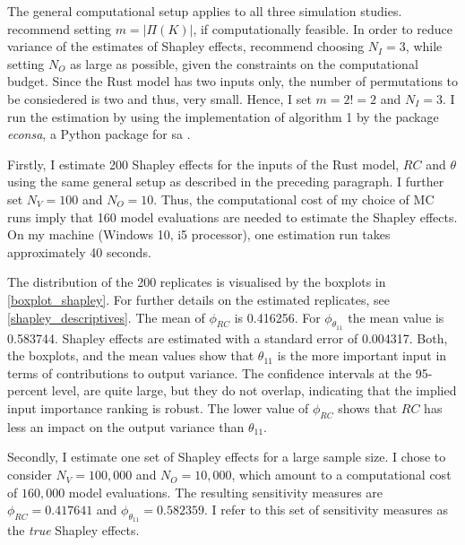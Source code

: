The general computational setup applies to all three simulation studies. \citet{SNS16} recommend setting $m=\vert \Pi(K) \vert$, if computationally feasible. In order to reduce variance of the estimates of Shapley effects, \citet{SNS16} recommend choosing $N_I=3$, while setting $N_O$ as large as possible, given the constraints on the computational budget. Since the Rust model has two inputs only, the number of permutations to be consiedered is two and thus, very small. Hence, I set $m=2!=2$ and $N_I=3$. I run the estimation by using the implementation of algorithm 1 by the package \textit{econsa}, a Python package for sa \citep{OSE21}.


Firstly, I estimate 200 Shapley effects for the inputs of the Rust model, $RC$ and $\theta$ using the same general setup as described in the preceding paragraph. I further set $N_V=100$ and $N_O=10$. Thus, the computational cost of my choice of MC runs imply that 160 model evaluations are needed to estimate the Shapley effects. On my machine (Windows 10, i5 processor), one estimation run takes approximately 40 seconds.

The distribution of the 200 replicates is visualised by the boxplots in \cref{boxplot_shapley}. For further details on the estimated replicates, see \cref{shapley_descriptives}. The mean of $\phi_{RC}$ is 0.416256. For $\phi_{\theta_{11}}$ the mean value is 0.583744. Shapley effects are estimated with a standard error of 0.004317.
Both, the boxplots, and the mean values show that $\theta_{11}$ is the more important input in terms of contributions to output variance. The confidence intervals at the 95-percent level, are quite large, but they do not overlap, indicating that the implied input importance ranking is robust. The lower value of $\phi_{RC}$ shows that $RC$ has less an impact on the output variance than $\theta_{11}$.


Secondly, I estimate one set of Shapley effects for a large sample size. I chose to consider $N_V=100,000$ and $N_O=10,000$, which amount to a computational cost of $160,000$ model evaluations. The resulting sensitivity measures are $\phi_{RC} = 0.417641$ and $\phi_{\theta_{11}} = 0.582359$. I refer to this set of sensitivity measures as the \textit{true} Shapley effects.


